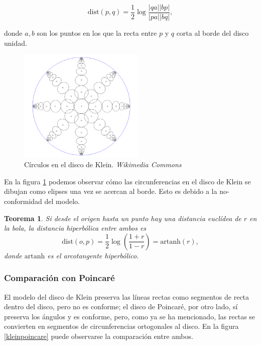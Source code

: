 \documentclass{article}
\theoremstyle{plain}
\newtheorem{theorem}{Teorema}
\theoremstyle{definition}
\theoremstyle{remark}
\begin{document}
\[
  \mathrm{dist}(p,q) = \frac{1}{2}\log\frac{|qa||bp|}{|pa||bq|},
\]

donde $a,b$ son los puntos en los que la recta entre $p$ y $q$ corta
al borde del disco unidad.

\begin{figure}[ht!]
  \centering
  \includegraphics[width=60mm]{./kleinmodelcircles.png}
  \caption{Círculos en el disco de Klein. \textit{Wikimedia Commons}\label{kleincircles}}
\end{figure}

En la figura \ref{kleincircles} podemos observar cómo las circunferencias
en el disco de Klein se dibujan como elipses una vez se acercan al borde.
Esto es debido a la no-conformidad del modelo.

\begin{theorem}
  Si desde el origen hasta un punto hay una distancia euclídea de $r$
  en la bola, la distancia hiperbólica entre ambos es
  \[
    \mathrm{dist}(o,p) = \frac{1}{2} \log\left(\frac{1+r}{1-r}\right) = \mathrm{artanh}(r),
  \]
  donde $\mathrm{artanh}$ es el arcotangente hiperbólico.
\end{theorem}

\subsubsection{Comparación con Poincaré}
El modelo del disco de Klein preserva las líneas rectas como segmentos
de recta dentro del disco, pero no es conforme; el disco de Poincaré,
por otro lado, sí preserva los ángulos y es conforme, pero, como ya se
ha mencionado, las rectas se convierten en segmentos de circunferencias
ortogonales al disco. En la figura \ref{kleinpoincare} puede observarse
la comparación entre ambos.
\end{document}
